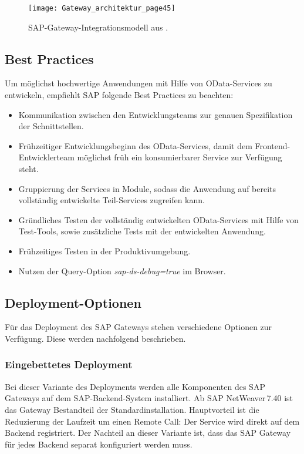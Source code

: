 \begin{figure}
	\centering
	\texttt{[image: Gateway\_architektur\_page45]} 
	\caption[SAP-Gateway-Integrationsmodell]{SAP-Gateway-Integrationsmodell aus \cite[S.\ 45]{BoennenDreesFischerHeinzStrothmann2014}.}
	\label{fig:GatewayArchitektur}
\end{figure}

\subsection{Best Practices}
Um möglichst hochwertige Anwendungen mit Hilfe von OData-Services zu entwickeln, empfiehlt SAP folgende Best Practices zu beachten\cite[S.\ 561-563]{BoennenDreesFischerHeinzStrothmann2014}: 
\begin{itemize} 
	\item Kommunikation zwischen den Entwicklungsteams zur genauen Spezifikation der Schnittstellen.
	\item Frühzeitiger Entwicklungsbeginn des OData-Services, damit dem Front\-end-Entwicklerteam möglichst früh ein konsumierbarer Service zur Verfügung steht. 
	\item Gruppierung der Services in Module, sodass die Anwendung auf bereits vollständig entwickelte Teil-Services zugreifen kann. 
	\item Gründliches Testen der vollständig entwickelten OData-Services mit Hilfe von Test-Tools, sowie zusätzliche Tests mit der entwickelten Anwendung. 
	\item Frühzeitiges Testen in der Produktivumgebung.
	\item Nutzen der Query-Option \textit{sap-ds-debug=true} im Browser.
 \end{itemize}

\subsection{Deployment-Optionen}
Für das Deployment des SAP Gateways stehen verschiedene Optionen zur Verfügung. Diese werden nachfolgend beschrieben.

\subsubsection{Eingebettetes Deployment}

Bei dieser Variante des Deployments werden alle Komponenten des SAP Gateways auf dem SAP-Backend-System installiert. Ab SAP NetWeaver\,7.40 ist das Gateway Bestandteil der Standardinstallation. Hauptvorteil ist die Reduzierung der Laufzeit um einen Remote Call: Der Service wird direkt auf dem Backend registriert. Der Nachteil an dieser Variante ist, dass das SAP Gateway für jedes Backend separat konfiguriert werden muss.

